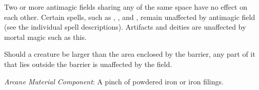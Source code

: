 {	Two or more antimagic fields sharing any of the same space have no effect on each other. Certain spells, such as , , and , remain unaffected by antimagic field (see the individual spell descriptions). Artifacts and deities are unaffected by mortal magic such as this.

	Should a creature be larger than the area enclosed by the barrier, any part of it that lies outside the barrier is unaffected by the field.

	\textit{Arcane Material Component}:
	A pinch of powdered iron or iron filings.

}
